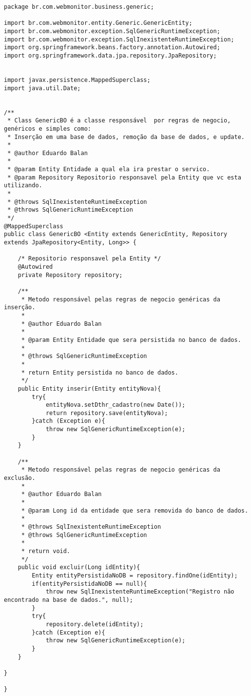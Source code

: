 \begin{lstlisting}[style=Java, label=Func:GenericBO,caption={[Entidade genérica GenericBO.]Entidade genérica GenericBO e suas funcionalidades.}]
package br.com.webmonitor.business.generic;

import br.com.webmonitor.entity.Generic.GenericEntity;
import br.com.webmonitor.exception.SqlGenericRuntimeException;
import br.com.webmonitor.exception.SqlInexistenteRuntimeException;
import org.springframework.beans.factory.annotation.Autowired;
import org.springframework.data.jpa.repository.JpaRepository;


import javax.persistence.MappedSuperclass;
import java.util.Date;


/**
 * Class GenericBO é a classe responsável  por regras de negocio, genéricos e simples como:
 * Inserção em uma base de dados, remoção da base de dados, e update.
 *
 * @author Eduardo Balan
 *
 * @param Entity Entidade a qual ela ira prestar o servico.
 * @param Repository Repositorio responsavel pela Entity que vc esta utilizando.
 *
 * @throws SqlInexistenteRuntimeException
 * @throws SqlGenericRuntimeException
 */
@MappedSuperclass
public class GenericBO <Entity extends GenericEntity, Repository extends JpaRepository<Entity, Long>> {

    /* Repositorio responsavel pela Entity */
    @Autowired
    private Repository repository;

    /**
     * Metodo responsável pelas regras de negocio genéricas da inserção.
     *
     * @author Eduardo Balan
     *
     * @param Entity Entidade que sera persistida no banco de dados.
     *
     * @throws SqlGenericRuntimeException
     *
     * return Entity persistida no banco de dados.
     */
    public Entity inserir(Entity entityNova){
        try{
            entityNova.setDthr_cadastro(new Date());
            return repository.save(entityNova);
        }catch (Exception e){
            throw new SqlGenericRuntimeException(e);
        }
    }

    /**
     * Metodo responsável pelas regras de negocio genéricas da exclusão.
     *
     * @author Eduardo Balan
     *
     * @param Long id da entidade que sera removida do banco de dados.
     *
     * @throws SqlInexistenteRuntimeException
     * @throws SqlGenericRuntimeException
     *
     * return void.
     */
    public void excluir(Long idEntity){
        Entity entityPersistidaNoDB = repository.findOne(idEntity);
        if(entityPersistidaNoDB == null){
            throw new SqlInexistenteRuntimeException("Registro não encontrado na base de dados.", null);
        }
        try{
            repository.delete(idEntity);
        }catch (Exception e){
            throw new SqlGenericRuntimeException(e);
        }
    }

}

}
\end{lstlisting}

%
